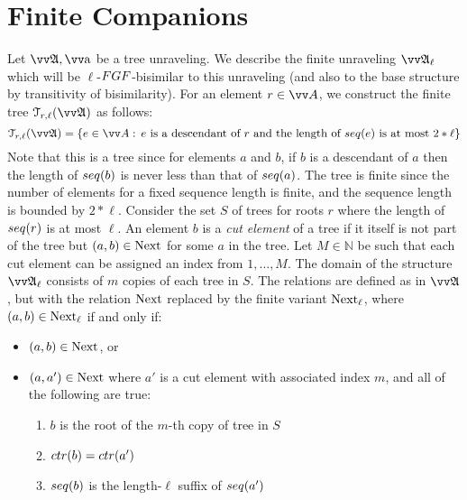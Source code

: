 
\section{Finite Companions}\label{sec:finite}
Let $\unravel{A}, \elemtuptuplea$ be a tree unraveling.
We describe the finite unraveling $\unravel{A}_{\ell}$ which will be $\ell$-$\FGF$-bisimilar to this unraveling (and also to the base structure by transitivity of bisimilarity).
For an element $r \in \unraveldom{A}$, we construct the finite tree $\mathcal{T}_{r,\ell}(\unravel{A})$ as follows:
\begin{equation*}
  \mathcal{T}_{r,\ell}(\unravel{A}) = \left\{ e \in \unraveldom{A}:\, e\ \text{is a descendant of $r$ and the length of $\seq{e}$ is at most $2 * \ell$} \right\}
\end{equation*}
Note that this is a tree since for elements $a$ and $b$, if $b$ is a descendant of $a$ then the length of $\seq{b}$ is never less than that of $\seq{a}$.
The tree is finite since the number of elements for a fixed sequence length is finite, and the sequence length is bounded by $2 * \ell$.
Consider the set $S$ of trees for roots $r$ where the length of $\seq{r}$ is at most $\ell$.
An element $b$ is a \emph{cut element} of a tree if it itself is not part of the tree but $(a,b) \in \mathrm{Next}$ for some $a$ in the tree.
Let $M \in \mathbb{N}$ be such that each cut element can be assigned an index from $1, \ldots, M$.
The domain of the structure $\unravel{A}_{\ell}$ consists of $m$ copies of each tree in $S$.
The relations are defined as in $\unravel{A}$, but with the relation $\mathrm{Next}$ replaced by the finite variant $\mathrm{Next}_{\ell}$, where $(a,b) \in \mathrm{Next}_{\ell}$ if and only if:
\begin{itemize}
  \item $(a,b) \in \mathrm{Next}$, or
  \item $(a,a') \in \mathrm{Next}$ where $a'$ is a cut element with associated index $m$, and all of the following are true:
        \begin{enumerate}
          \item $b$ is the root of the $m$-th copy of tree in $S$
          \item $\ctr{b} = \ctr{a'}$
          \item $\seq{b}$ is the length-$\ell$ suffix of $\seq{a'}$
        \end{enumerate}
\end{itemize}

